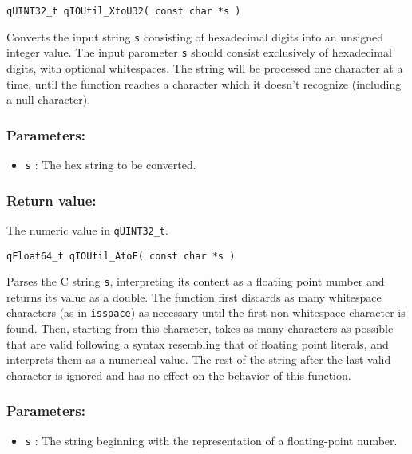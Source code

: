 \begin{lstlisting}[style=CStyle]
qUINT32_t qIOUtil_XtoU32( const char *s )
\end{lstlisting}

Converts the input string \lstinline{s} consisting of hexadecimal digits into an unsigned 
integer value. The input parameter \lstinline{s} should consist exclusively of hexadecimal 
digits, with optional whitespaces. The string will be processed one character at
a time, until the function reaches a character which it doesn't recognize
(including a null character). 
 
\subsubsection*{Parameters:}
\begin{itemize}
    \item \lstinline{s} : The hex string to be converted.
\end{itemize}

\subsubsection*{Return value:}
The numeric value in \lstinline{qUINT32_t}.


\noindent\hrulefill

\begin{lstlisting}[style=CStyle]
qFloat64_t qIOUtil_AtoF( const char *s )
\end{lstlisting}

Parses the C string \lstinline{s}, interpreting its content as a floating point number and 
returns its value as a double. The function first discards as many whitespace 
characters (as in \lstinline{isspace}) as necessary until the first non-whitespace character is found. Then, starting from this character, takes as many characters as possible that are valid following a syntax resembling that of floating point literals, and 
interprets them as a numerical value. The rest of the string after the last valid 
character is ignored and has no effect on the behavior of this function. 

\subsubsection*{Parameters:}
\begin{itemize}
    \item \lstinline{s} : The string beginning with the representation of a floating-point number.
\end{itemize}

